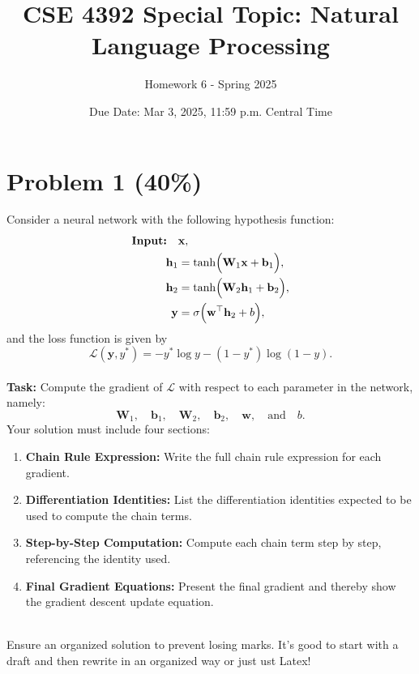 \documentclass{article}
\begin{document}
\title{CSE 4392 Special Topic: Natural Language Processing}
\author{Homework 6 - Spring 2025}
\date{Due Date: Mar 3, 2025, 11:59 p.m. Central Time}
\maketitle
\thispagestyle{fancy}

\section*{Problem 1 (40\%)}

Consider a neural network with the following hypothesis function:
\begin{align*}
\textbf{Input:} \quad & \mathbf{x}, \\
\mathbf{h}_1 &= \tanh\Bigl(\mathbf{W}_1 \mathbf{x} + \mathbf{b}_1\Bigr), \\
\mathbf{h}_2 &= \tanh\Bigl(\mathbf{W}_2 \mathbf{h}_1 + \mathbf{b}_2\Bigr), \\
\mathbf{y} &= \sigma\Bigl(\mathbf{w}^\top \mathbf{h}_2 + b\Bigr),
\end{align*}
and the loss function is given by
\[
\mathcal{L}(\mathbf{y}, y^*) = -y^*\log y - (1-y^*)\log (1-y).
\]
\\[10pt]
\textbf{Task:} Compute the gradient of $\mathcal{L}$ with respect to each parameter in the network, namely:
\[
\mathbf{W}_1,\quad \mathbf{b}_1,\quad \mathbf{W}_2,\quad \mathbf{b}_2,\quad \mathbf{w},\quad \text{and} \quad b.
\]
Your solution must include four sections:
\begin{enumerate}
    \item \textbf{Chain Rule Expression:} Write the full chain rule expression for each gradient.
    \item \textbf{Differentiation Identities:} List the differentiation identities expected to be used to compute the chain terms.
    \item \textbf{Step-by-Step Computation:} Compute each chain term step by step, referencing the identity used.
    \item \textbf{Final Gradient Equations:} Present the final gradient and thereby show the gradient descent update equation.
\end{enumerate}
\\[10pt]
Ensure an organized solution to prevent losing marks. It's good to start with a draft and then rewrite in an organized way or just ust Latex!
\end{document}
